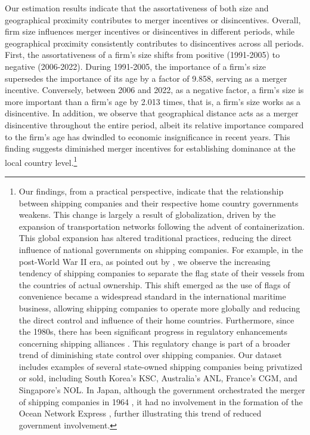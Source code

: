 \documentclass[10pt]{article}
\begin{document}
Our estimation results indicate that the assortativeness of both size and geographical proximity contributes to merger incentives or disincentives. 
Overall, firm size influences merger incentives or disincentives in different periods, while geographical proximity consistently contributes to disincentives across all periods.
First, the assortativeness of a firm's size shifts from positive (1991-2005) to negative (2006-2022). 
During 1991-2005, the importance of a firm's size supersedes the importance of its age by a factor of 9.858, serving as a merger incentive.
Conversely, between 2006 and 2022, as a negative factor, a firm's size is more important than a firm's age by 2.013 times, that is, a firm's size works as a disincentive.
In addition, we observe that geographical distance acts as a merger disincentive throughout the entire period, albeit its relative importance compared to the firm's age has dwindled to economic insignificance in recent years. 
This finding suggests diminished merger incentives for establishing dominance at the local country level.\footnote{Our findings, from a practical perspective, indicate that the relationship between shipping companies and their respective home country governments weakens. This change is largely a result of globalization, driven by the expansion of transportation networks following the advent of containerization. This global expansion has altered traditional practices, reducing the direct influence of national governments on shipping companies. For example, in the post-World War II era, as pointed out by \cite{Heidbrink2012}, we observe the increasing tendency of shipping companies to separate the flag state of their vessels from the countries of actual ownership. This shift emerged as the use of flags of convenience became a widespread standard in the international maritime business, allowing shipping companies to operate more globally and reducing the direct control and influence of their home countries. Furthermore, since the 1980s, there has been significant progress in regulatory enhancements concerning shipping alliances \citep{matsuda2022unified}. This regulatory change is part of a broader trend of diminishing state control over shipping companies. Our dataset includes examples of several state-owned shipping companies being privatized or sold, including South Korea's KSC, Australia's ANL, France's CGM, and Singapore's NOL. In Japan, although the government orchestrated the merger of shipping companies in 1964 \citep{otani2021estimating}, it had no involvement in the formation of the Ocean Network Express \citep{hatano2023}, further illustrating this trend of reduced government involvement.}
\end{document}
